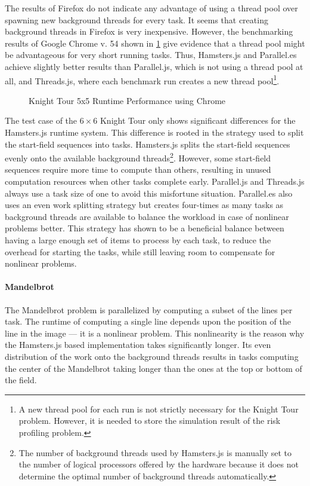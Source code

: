 The results of Firefox do not indicate any advantage of using a thread pool over spawning new background threads for every task. It seems that creating background threads in Firefox is very inexpensive. However, the benchmarking results of Google Chrome v. 54 shown in \cref{fig:runtime-performance-chrome} give evidence that a thread pool might be advantageous for very short running tasks. Thus, Hamsters.js and Parallel.es achieve slightly better results than Parallel.js, which is not using a thread pool at all, and Threads.js, where each benchmark run creates a new thread pool\footnote{A new thread pool for each run is not strictly necessary for the Knight Tour problem. However, it is needed to store the simulation result of the risk profiling problem.}. 

\begin{figure}
	\centering
	
	\caption{Knight Tour 5x5 Runtime Performance using Chrome}
	\label{fig:runtime-performance-chrome}
\end{figure}

The test case of the $6\times6$ Knight Tour only shows significant differences for the Hamsters.js runtime system. This difference is rooted in the strategy used to split the start-field sequences into tasks. Hamsters.js splits the start-field sequences evenly onto the available background threads\footnote{The number of background threads used by Hamsters.js is manually set to the number of logical processors offered by the hardware because it does not determine the optimal number of background threads automatically.}. However, some start-field sequences require more time to compute than others, resulting in unused computation resources when other tasks complete early. Parallel.js and Threads.js always use a task size of one to avoid this misfortune situation. Parallel.es also uses an even work splitting strategy but creates four-times as many tasks as background threads are available to balance the workload in case of nonlinear problems better. This strategy has shown to be a beneficial balance between having a large enough set of items to process by each task, to reduce the overhead for starting the tasks, while still leaving room to compensate for nonlinear problems. 

\paragraph{Mandelbrot}
The Mandelbrot problem is parallelized by computing a subset of the lines per task. The runtime of computing a single line depends upon the position of the line in the image --- it is a nonlinear problem. This nonlinearity is the reason why the Hamsters.js based implementation takes significantly longer. Its even distribution of the work onto the background threads results in tasks computing the center of the Mandelbrot taking longer than the ones at the top or bottom of the field. 

